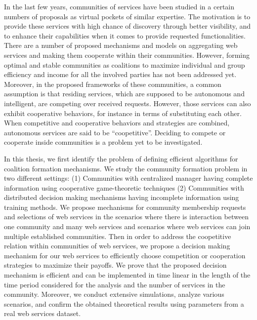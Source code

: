 
In the last few years, communities of services have been studied in a certain numbers of proposals as virtual pockets of similar expertise. The motivation is to provide these services with high chance of discovery through better visibility, and to enhance their capabilities when it comes to provide requested functionalities. There are a number of proposed mechanisms and models on aggregating web services and making them cooperate within their communities. However, forming optimal and stable communities as coalitions to maximize individual and group efficiency and income for all the involved parties has not been addressed yet. Moreover, in the proposed frameworks of these communities, a common assumption is that residing services, which are supposed to be autonomous and intelligent, are competing over received requests. However, those services can also exhibit cooperative behaviors, for instance in terms of substituting each other. When competitive and cooperative behaviors and strategies are combined, autonomous services are said to be ``coopetitive''. Deciding to compete or cooperate inside communities is a problem yet to be investigated.

In this thesis, we first identify the problem of defining efficient algorithms for coalition formation mechanisms. We study the community formation problem in two different settings: (1) Communities with centralized manager having complete information using cooperative game-theoretic techniques (2) Communities with distributed decision making mechanisms having incomplete information using training methods. We propose mechanisms for community membership requests and selections of web services in the scenarios where there is interaction between one community and many web services and scenarios where web services can join multiple established communities. Then in order to address the coopetitive relation within communities of web services, we propose a decision making mechanism for our web services to efficiently choose competition or cooperation strategies to maximize their payoffs. We prove that the proposed decision mechanism is efficient and can be implemented in time linear in the length of the time period considered for the analysis and the number of services in the community. Moreover, we conduct extensive simulations, analyze various scenarios, and confirm the obtained theoretical results using parameters from a real web services dataset.


